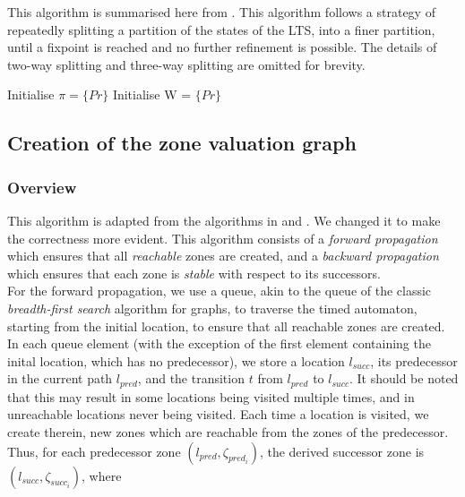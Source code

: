 \documentclass[a4paper]{llncs}
\begin{document}
This algorithm is summarised here from
\cite{fernandez1990implementation}. This algorithm follows a strategy
of repeatedly splitting a partition of the states of the LTS, into a
finer partition, until a fixpoint is reached and no further refinement
is possible. The details of two-way splitting and three-way splitting
are omitted for brevity.

\begin{algorithm2e}[H]
  Initialise $\pi = \{Pr\}$\;
  Initialise W = $\{Pr\}$
\end{algorithm2e}

\subsection{Creation of the zone valuation graph}

\subsubsection{Overview}

This algorithm is adapted from the algorithms in
\cite{DBLP:conf/cav/GuhaNA12} and \cite{guha2013notes}. We changed it
to make the correctness more evident. 
This algorithm consists of a \emph{forward
  propagation} which ensures that all \emph{reachable} zones are created, and a
\emph{backward propagation} which ensures that each zone is \emph{stable} with
respect to its successors. \\

For the forward propagation, we use a queue,
akin to the queue of the classic \emph{breadth-first search} algorithm
for graphs, to traverse the timed automaton, starting from the initial
location, to ensure that all reachable zones are created. In each
queue element (with the exception of the first element containing the
inital location, which has no predecessor), we store a location
$l_{succ}$, its predecessor in the current path $l_{pred}$, and the
transition $t$ from $l_{pred}$ to $l_{succ}$. It should be noted
that this may result in some locations being visited multiple times,
and in unreachable locations never being visited. Each time a location
is visited, we create therein, new zones which are reachable from the
zones of the predecessor. \\
Thus, for each predecessor zone $(l_{pred}, \zeta _{pred_{i}})$, the
derived successor zone is $(l_{succ}, \zeta _{succ_{i}})$, where
\end{document}
